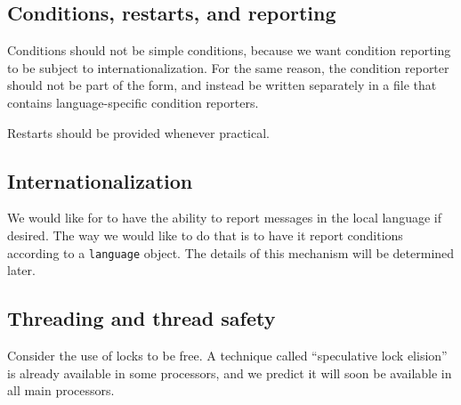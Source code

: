 \subsection{Conditions, restarts, and reporting}

Conditions should not be simple conditions, because we want condition
reporting to be subject to internationalization.   For the same
reason, the condition reporter should not be part of the
 form, and instead be written separately in a
file that contains language-specific condition reporters. 

Restarts should be provided whenever practical. 

\subsection{Internationalization}

We would like for {\sysname} to have the ability to report messages in
the local language if desired.  The way we would like to do that is to
have it report conditions according to a \texttt{language} object.
The details of this mechanism will be determined later.
\subsection{Threading and thread safety}

Consider the use of locks to be free.  A technique called
``speculative lock elision'' is already available in some processors,
and we predict it will soon be available in all main processors.

